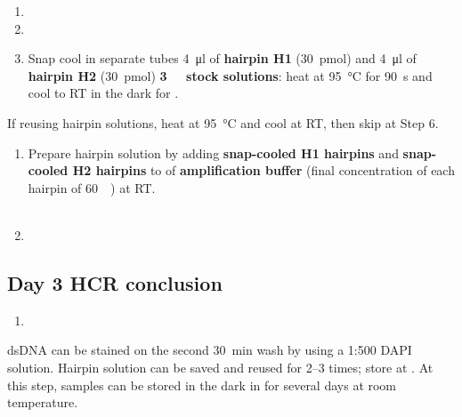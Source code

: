 \documentclass[10pt]{report}
\begin{document}
\begin{enumerate}[resume = steps]
	\item {}
	\item {}
	\item Snap cool in separate tubes \qty{4}{\ul} of \textbf{hairpin H1} (\qty{30}{\pmol}) and \qty{4}{\ul} of \textbf{hairpin H2} (\qty{30}{\pmol}) \textbf{\qty{3}{\micro\molar} stock solutions}: heat at \qty{95}{\degreeCelsius} for \qty{90}{\s} and cool to RT in the dark for \halfhour.
\end{enumerate}

\bigskip\alert{If reusing hairpin solutions, heat at \qty{95}{\degreeCelsius} and cool at RT, then skip at Step 6.}

\begin{enumerate}[resume = steps]
	\item Prepare hairpin solution by adding \textbf{snap-cooled H1 hairpins} and \textbf{snap-cooled H2 hairpins} to \twohunmicrol{} of \textbf{amplification buffer} (final concentration of each hairpin of \qty{60}{\nano\molar}) at RT.\\
	      \\
	\item {}
\end{enumerate}

\subsection*{Day 3 \textendash{} HCR conclusion}

\begin{enumerate}[series = steps]
	\item {}
\end{enumerate}

\bigskip\alert{dsDNA can be stained on the second \qty{30}{\minute} wash by using a 1:500 DAPI solution.}
\alert{Hairpin solution can be saved and reused for 2--3 times; store at \minustwenty.}
\alert{At this step, samples can be stored in the dark in \ssct for several days at room temperature.}
\end{document}
